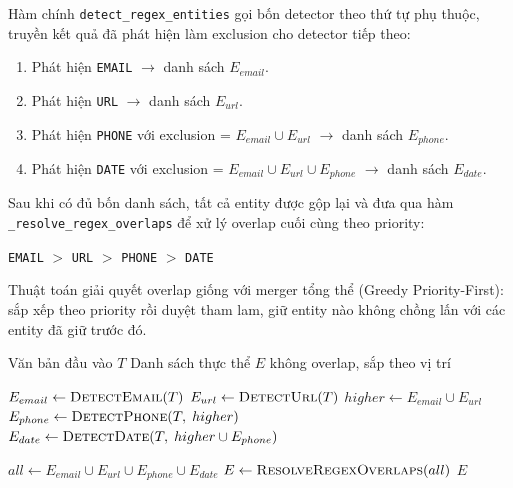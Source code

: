Hàm chính \texttt{detect\_regex\_entities} gọi bốn detector theo thứ tự phụ
thuộc, truyền kết quả đã phát hiện làm exclusion cho detector tiếp theo:

\begin{enumerate}[nosep]
    \item Phát hiện \texttt{EMAIL} $\rightarrow$ danh sách $E_{email}$.
    \item Phát hiện \texttt{URL} $\rightarrow$ danh sách $E_{url}$.
    \item Phát hiện \texttt{PHONE} với exclusion = $E_{email} \cup E_{url}$
          $\rightarrow$ danh sách $E_{phone}$.
    \item Phát hiện \texttt{DATE} với exclusion = $E_{email} \cup E_{url}
          \cup E_{phone}$ $\rightarrow$ danh sách $E_{date}$.
\end{enumerate}

Sau khi có đủ bốn danh sách, tất cả entity được gộp lại và đưa qua hàm
\texttt{\_resolve\_regex\_overlaps} để xử lý overlap cuối cùng theo priority:

\begin{center}
    \texttt{EMAIL} $>$ \texttt{URL} $>$ \texttt{PHONE} $>$ \texttt{DATE}
\end{center}

Thuật toán giải quyết overlap giống với merger tổng thể (Greedy Priority-First):
sắp xếp theo priority rồi duyệt tham lam, giữ entity nào không chồng lấn với
các entity đã giữ trước đó.

\begin{algorithm}[H]
    \caption{Pipeline nhận diện thực thể bằng regex}
    \label{alg:regex_pipeline}
    \begin{algorithmic}[1]
        \Require Văn bản đầu vào $T$
        \Ensure Danh sách thực thể $E$ không overlap, sắp theo vị trí

        \State $E_{email} \leftarrow \textsc{DetectEmail}(T)$
        \State $E_{url} \leftarrow \textsc{DetectUrl}(T)$
        \State $higher \leftarrow E_{email} \cup E_{url}$
        \State $E_{phone} \leftarrow \textsc{DetectPhone}(T,\; higher)$
        \State $E_{date} \leftarrow \textsc{DetectDate}(T,\; higher \cup E_{phone})$

        \State $all \leftarrow E_{email} \cup E_{url} \cup E_{phone} \cup E_{date}$
        \State $E \leftarrow \textsc{ResolveRegexOverlaps}(all)$
        \State \Return $E$
    \end{algorithmic}
\end{algorithm}

